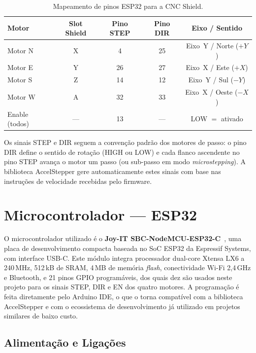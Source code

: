 \begin{table}[h]
\centering
\caption{Mapeamento de pinos ESP32 para a CNC Shield.}
\label{tab:mapeamento-pinos}
\begin{tabular}{lcccc}
\hline
\textbf{Motor} & \textbf{Slot Shield} & \textbf{Pino STEP} & \textbf{Pino DIR} & \textbf{Eixo / Sentido} \\
\hline
Motor N & X & 4 & 25 & Eixo~Y / Norte ($+Y$) \\
Motor E & Y & 26 & 27 & Eixo~X / Este ($+X$) \\
Motor S & Z & 14 & 12 & Eixo~Y / Sul ($-Y$) \\
Motor W & A & 32 & 33 & Eixo~X / Oeste ($-X$) \\
Enable (todos) & --- & 13 & --- & LOW $=$ ativado \\
\hline
\end{tabular}
\end{table}

Os sinais STEP e DIR seguem a convenção padrão dos motores de passo: o pino DIR define o sentido de rotação (HIGH ou LOW) e cada flanco ascendente no pino STEP avança o motor um passo (ou sub-passo em modo \textit{microstepping}). A biblioteca AccelStepper gere automaticamente estes sinais com base nas instruções de velocidade recebidas pelo firmware.


\section{Microcontrolador --- ESP32}
\label{sec:microcontrolador}

O microcontrolador utilizado é o \textbf{Joy-IT SBC-NodeMCU-ESP32-C}~\cite{JoyITESP32}, uma placa de desenvolvimento compacta baseada no SoC ESP32 da Espressif Systems, com interface USB-C. Este módulo integra processador dual-core Xtensa LX6 a 240\,MHz, 512\,kB de SRAM, 4\,MB de memória \textit{flash}, conectividade Wi-Fi 2,4\,GHz e Bluetooth, e 21 pinos GPIO programáveis, dos quais dez são usados neste projeto para os sinais STEP, DIR e EN dos quatro motores. A programação é feita diretamente pelo Arduino IDE, o que o torna compatível com a biblioteca AccelStepper e com o ecossistema de desenvolvimento já utilizado em projetos similares de baixo custo.



\subsection{Alimentação e Ligações}
\label{subsec:alimentacao-ligacoes}

